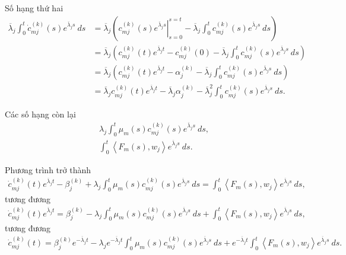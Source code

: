 \documentclass[12pt,a4paper]{article}
\theoremstyle{definition}
\begin{document}
Số hạng thứ hai
\begin{align*}
    \overline{\lambda}_j \int_0^t \dot{c}_{mj}^{(k)}(s) e^{\overline{\lambda}_j s}\:ds
    &= \overline{\lambda}_j \left(\left.c_{mj}^{(k)}(s) e^{\overline{\lambda}_j s}\right|_{s=0}^{s=t} - \overline{\lambda}_j \int_0^t c_{mj}^{(k)}(s) e^{\overline{\lambda}_j s} \:ds\right) \\
    &= \overline{\lambda}_j \left(c_{mj}^{(k)}(t) e^{\overline{\lambda}_j t} - c_{mj}^{(k)}(0) - \overline{\lambda}_j \int_0^t c_{mj}^{(k)}(s) e^{\overline{\lambda}_j s} \:ds\right) \\
    &= \overline{\lambda}_j \left(c_{mj}^{(k)}(t) e^{\overline{\lambda}_j t} - \alpha_j^{(k)} - \overline{\lambda}_j \int_0^t c_{mj}^{(k)}(s) e^{\overline{\lambda}_j s} \:ds\right) \\
    &= \overline{\lambda}_j c_{mj}^{(k)}(t) e^{\overline{\lambda}_j t} - \overline{\lambda}_j \alpha_j^{(k)} - \overline{\lambda}^2_j \int_0^t c_{mj}^{(k)}(s) e^{\overline{\lambda}_j s} \:ds.
\end{align*}

Các số hạng còn lại
\begin{align*}
    \lambda_j \int_0^t \mu_m(s) c_{mj}^{(k)}(s) e^{\overline{\lambda}_j s}\:ds, \\
    \int_0^t \left<F_m(s),w_j\right>e^{\overline{\lambda}_j s}\:ds.
\end{align*}

Phương trình trở thành
\begin{align*}
    \dot{c}_{mj}^{(k)}(t) e^{\overline{\lambda}_j t} - \beta_j^{(k)}
    + \lambda_j \int_0^t \mu_m(s) c_{mj}^{(k)}(s) e^{\overline{\lambda}_j s}\:ds
    = \int_0^t \left<F_m(s),w_j\right>e^{\overline{\lambda}_j s}\:ds,
\end{align*}
tương đương
\begin{align*}
    \dot{c}_{mj}^{(k)}(t) e^{\overline{\lambda}_j t}
    = \beta_j^{(k)}
    - \lambda_j \int_0^t \mu_m(s) c_{mj}^{(k)}(s) e^{\overline{\lambda}_j s}\:ds
    + \int_0^t \left<F_m(s),w_j\right>e^{\overline{\lambda}_j s}\:ds,
\end{align*}
tương đương
\begin{align*}
    \dot{c}_{mj}^{(k)}(t)
    = \beta_j^{(k)} e^{-\overline{\lambda}_j t}
    - \lambda_j e^{-\overline{\lambda}_j t} \int_0^t \mu_m(s) c_{mj}^{(k)}(s) e^{\overline{\lambda}_j s}\:ds
    + e^{-\overline{\lambda}_j t} \int_0^t \left<F_m(s),w_j\right>e^{\overline{\lambda}_j s}\:ds.
\end{align*}
\end{document}

